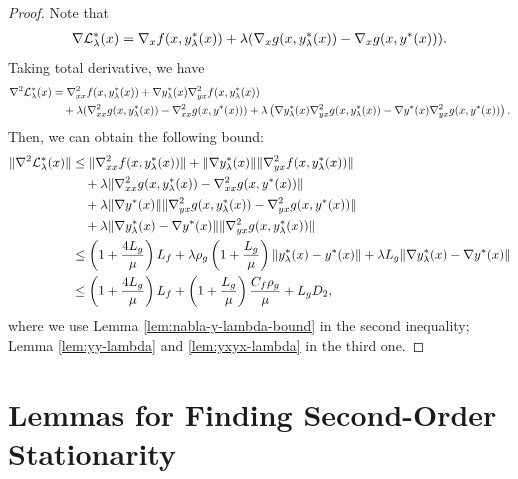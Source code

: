 \begin{proof}
Note that 
\begin{align*}
    \nabla {\mathcal{L}}_{\lambda}^*(x) = \nabla_x f(x,y_{\lambda}^*(x)) + \lambda (\nabla_x g(x,y_{\lambda}^*(x) ) - \nabla_x g(x,y^*(x))). 
\end{align*}
Taking total derivative, we have
\begin{align} \label{eq:nabla2-Lag}
\begin{split}
    \nabla^2 {\mathcal{L}}_{\lambda}^*(x) &= \nabla_{xx}^2 f (x,y_{\lambda}^*(x))+ \nabla y_{\lambda}^*(x) \nabla_{yx}^2  f(x,y_{\lambda}^*(x))  \\
    &\quad +\lambda (\nabla_{xx}^2 g(x,y_{\lambda}^*(x))-\nabla_{xx}^2 g(x,y^*(x))) + \lambda \left(\nabla y_{\lambda}^*(x)  \nabla_{yx}^2 g(x,y_{\lambda}^*(x)) - \nabla y^*(x) \nabla_{yx}^2 g(x,y^*(x)) \right).
\end{split}
\end{align}
Then, we can obtain the following bound:
\begin{align*}
    \Vert \nabla^2 {\mathcal{L}}_{\lambda}^*(x) \Vert &\le \Vert \nabla_{xx}^2 f(x,y_{\lambda}^*(x)) \Vert + \Vert \nabla y_{\lambda}^*(x) \Vert \Vert \nabla_{yx}^2 f(x,y_{\lambda}^*(x)) \Vert \\
    &\quad + \lambda \Vert \nabla_{xx}^2 g(x,y_{\lambda}^*(x)) - \nabla_{xx}^2 g(x,y^*(x)) \Vert \\
    &\quad + \lambda \Vert \nabla y^*(x) \Vert \Vert \nabla_{yx}^2 g(x,y_{\lambda}^*(x)) - \nabla_{yx}^2 g(x,y^*(x)) \Vert \\
    &\quad  + \lambda \Vert \nabla y_{\lambda}^*(x) - \nabla y^*(x) \Vert \Vert \nabla_{yx}^2 g(x,y_{\lambda}^*(x)) \Vert\\
    &\le \left(1+ \frac{4L_g}{\mu} \right) L_f  + \lambda \rho_g \left(1+ \frac{L_g}{\mu} \right) \Vert y_{\lambda}^*(x) - y^*(x) \Vert +\lambda L_g \Vert \nabla y_{\lambda}^*(x) - \nabla y^*(x) \Vert  \\
    &\le \left(1+ \frac{4L_g}{\mu} \right) L_f  + \left(1+ \frac{L_g}{\mu} \right) \frac{C_f \rho_g}{\mu} +L_g D_2,
\end{align*}
where we use Lemma \ref{lem:nabla-y-lambda-bound}
in the second inequality; Lemma \ref{lem:yy-lambda} and \ref{lem:yxyx-lambda} in the third one.
\end{proof}


\section{Lemmas for Finding Second-Order Stationarity}


